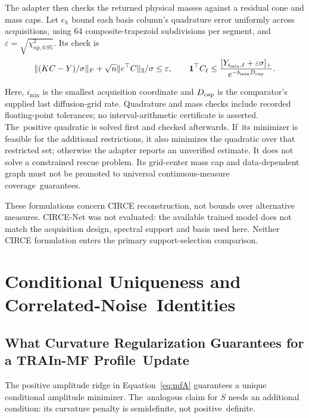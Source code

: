 \documentclass[mathematics,article,accept,moreauthors]{Definitions/mdpi}
\newcommand{\one}{\mathbf{1}}
\begin{document}
The adapter then checks the returned physical masses against a residual cone and mass caps. Let $e_h$ bound each basis column's quadrature error uniformly across acquisitions, using 64 composite-trapezoid subdivisions per segment, and~$\varepsilon=\sqrt{\chi^2_{np,0.95}}$. Its check is
\begin{equation}\label{eq:circecheck}
 \|(KC-Y)/\sigma\|_F+\sqrt n\|e^\top C\|_2/\sigma\leq\varepsilon,
 \qquad \one^\top C_\ell\leq
 \frac{[Y_{i_{\min},\ell}+\varepsilon\sigma]_+}{e^{-b_{\min}D_{\rm cap}}}.
\end{equation}

Here, $i_{\min}$ is the smallest acquisition coordinate and $D_{\rm cap}$ is the comparator's supplied last diffusion-grid rate. Quadrature and mass checks include recorded floating-point tolerances; no interval-arithmetic certificate is asserted. The~positive quadratic is solved first and checked afterwards. If~its minimizer is feasible for the additional restrictions, it also minimizes the quadratic over that restricted set; otherwise the adapter reports an unverified estimate. It does not solve a constrained rescue problem. Its grid-center mass cap and data-dependent graph must not be promoted to universal continuous-measure coverage~guarantees.

These formulations concern CIRCE reconstruction, not bounds over alternative measures. CIRCE-Net was not evaluated: the available trained model does not match the acquisition design, spectral support and basis used here. Neither CIRCE formulation enters the primary support-selection comparison.


%


\section{Conditional Uniqueness and Correlated-Noise~Identities}\label{app:auditmath}

\subsection{What Curvature Regularization Guarantees for a TRAIn-MF Profile~Update}
The positive amplitude ridge in Equation~\eqref{eq:mfA} guarantees a unique conditional amplitude minimizer. The~analogous claim for $S$ needs an additional condition: its curvature penalty is semidefinite, not positive~definite.
\end{document}
